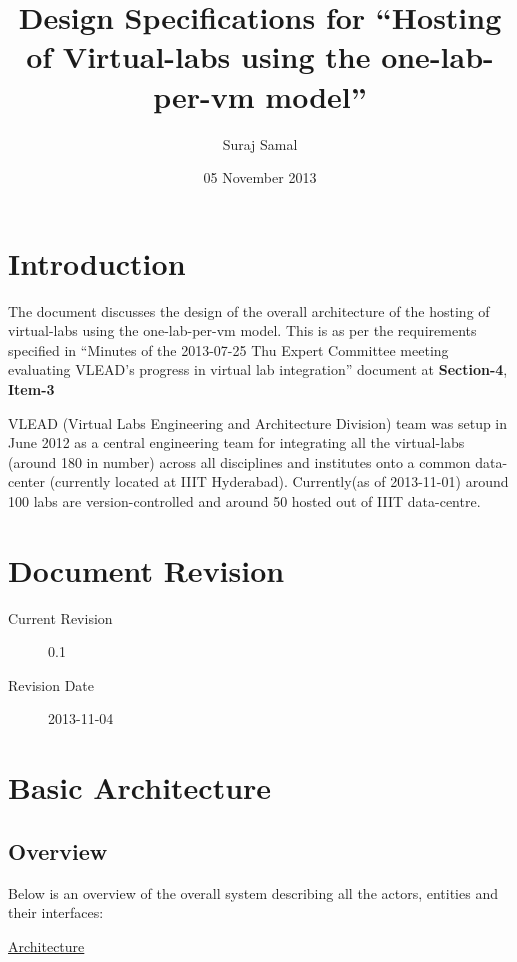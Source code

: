 \documentclass[11pt]{article}
\title{Design Specifications for ``Hosting of Virtual-labs using the one-lab-per-vm model''}
\author{Suraj Samal}
\date{05 November 2013}
\begin{document}
\maketitle

\setcounter{tocdepth}{3}
\tableofcontents
\vspace*{1cm}
\listoftables
\listoffigures

\section{Introduction}
\label{sec-1}


   The document discusses the design of the overall architecture of
   the hosting of virtual-labs using the one-lab-per-vm model. This is
   as per the requirements specified in ``Minutes of the 2013-07-25 Thu
   Expert Committee meeting evaluating VLEAD’s progress in virtual lab
   integration'' document at \textbf{Section-4}, \textbf{Item-3}

   VLEAD (Virtual Labs Engineering and Architecture Division) team was
   setup in June 2012 as a central engineering team for integrating
   all the virtual-labs (around 180 in number) across all disciplines
   and institutes onto a common data-center (currently located at IIIT
   Hyderabad). Currently(as of 2013-11-01) around 100 labs are
   version-controlled and around 50 hosted out of IIIT data-centre.

\section{Document Revision}
\label{sec-2}

\begin{description}
\item [Current Revision] 0.1
\item [Revision Date] 2013-11-04
\end{description}
\section{Basic Architecture}
\label{sec-3}

\subsection{Overview}
\label{sec-3.1}

   Below is an overview of the overall system
   describing all the actors, entities and their interfaces:

   \href{file://../architecture.jpg }{Architecture}
\end{document}
